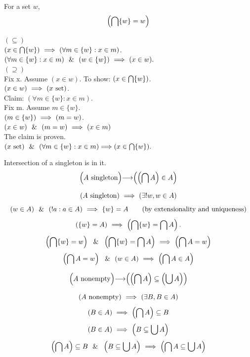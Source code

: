 \begin{theorem}
For a set $w$,
\[\left(\bigcap\{w\}=w\right)\]
\end{theorem}
\Proof
$(\subseteq)$\\
$(x\in\bigcap \{w\})\ \Longrightarrow\ (\forall m\in\{w\}:x\in m)$.\\
$(\forall m\in\{w\}:x\in m)\ \ \&\ \ (w\in \{w\})\ \Longrightarrow\ (x\in w).$\\
$(\supseteq)$\\
Fix x. Assume $(x\in w)$. To show: $(x\in\bigcap\{w\})$.\\
$(x\in w)\ \Longrightarrow\ (x\mathrm{\ set})$.\\
Claim: $(\forall m\in\{w\}:x\in m).$\\
Fix m. Assume $m\in\{w\}$.\\
$(m\in\{w\})\ \Longrightarrow\ (m=w)$.\\
$(x\in w)\ \ \&\ \ (m=w)\ \Longrightarrow\ (x\in m)$\\
The claim is proven.\\
$(x\mathrm{\ set})\ \ \&\ \ (\forall m\in\{w\}:x\in m) \Longrightarrow (x\in\bigcap\{w\}).$
\Done

\begin{theorem}
Intersection of a singleton is in it.
\[
\left(A \singleton\middle)
\implies
\middle(\left(\intersection A\right)\in A\right)
\label{thm:intersection of singleton}%
\]
\end{theorem}
\Proof
\[(A\mathrm{\ singleton})\ \Longrightarrow\ (\exists!w,w\in A)\]
\[
(w\in A)\ \ \&\ \ (!a:a\in A)
\ \Longrightarrow\ 
\{w\}=A
\tag{by extensionality and uniqueness}
\]
\[
(\{w\}=A)
\ \Longrightarrow\ 
\left(\bigcap\{w\}=\bigcap A\right).
\]
\[
\left(\bigcap\{w\}=w\right)
\ \ \&\ \ 
\left(\bigcap\{w\}=\bigcap A\right)
\ \Longrightarrow\ 
\left(\bigcap A=w\right)\]
\[
\left(\bigcap A=w\right)
\ \ \&\ \ 
(w\in A)
\ \Longrightarrow\ 
\left(\bigcap A\in A\right)
\]
\Done


\begin{theorem}
\[
\left(A \mathrm{\ nonempty}\middle) \longrightarrow \middle(\left(\bigcap A\right)\subseteq \left(\bigcup A\right)\right)
\label{thm:intersection of nonempty is subset of union}
\]
\end{theorem}
\Proof
\[
(A \mathrm{\ nonempty})
\ \Longrightarrow\ 
(\exists B,B\in A)
\]
\[
(B\in A)
\ \Longrightarrow\ 
\left(\bigcap A\right)\subseteq B
\]
\[
(B\in A)
\ \Longrightarrow\ 
\left(B \subseteq \bigcup A\right)
\]
\[
\left(\bigcap A\right)\subseteq B
\ \ \&\ \ 
\left(B \subseteq \bigcup A\right)
\ \Longrightarrow\ 
\left(\bigcap A \subseteq \bigcup A\right)
\]
\Done

